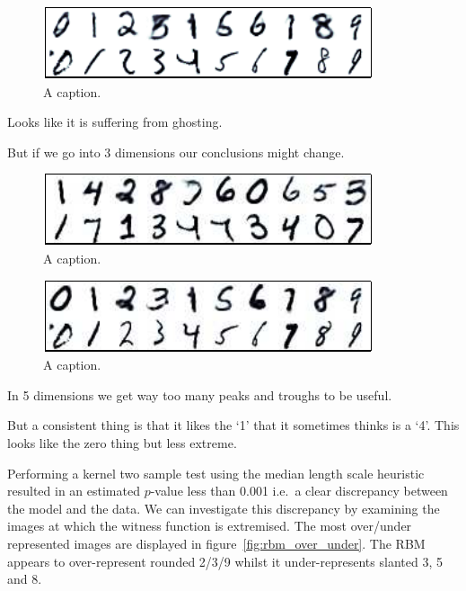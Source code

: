 \documentclass{article} %
\def\ie{i.e.\ }
\begin{document}
\begin{figure}[ht]
\centering
\includegraphics[width=0.98\columnwidth]{figures/dbn_ft_cond}
\caption{
A caption.
}
\label{fig:dbn_ft_cond}
\end{figure}

Looks like it is suffering from ghosting.

But if we go into 3 dimensions our conclusions might change.

\begin{figure}[ht]
\centering
\includegraphics[width=0.98\columnwidth]{figures/dbn_ft_3_witness_peaks}
\caption{
A caption.
}
\label{fig:dbn_ft_witness_peaks}
\end{figure}

\begin{figure}[ht]
\centering
\includegraphics[width=0.98\columnwidth]{figures/dbn_ft_3_cond}
\caption{
A caption.
}
\label{fig:dbn_ft_cond}
\end{figure}

In 5 dimensions we get way too many peaks and troughs to be useful.

But a consistent thing is that it likes the `1' that it sometimes thinks is a `4'.
This looks like the zero thing but less extreme.


Performing a kernel two sample test using the median length scale heuristic resulted in an estimated $p$-value less than 0.001 \ie a clear discrepancy between the model and the data.
We can investigate this discrepancy by examining the images at which the witness function is extremised.
The most over/under represented images are displayed in figure~\ref{fig:rbm_over_under}.
The RBM appears to over-represent rounded 2/3/9 whilst it under-represents slanted 3, 5 and 8.
\end{document}

